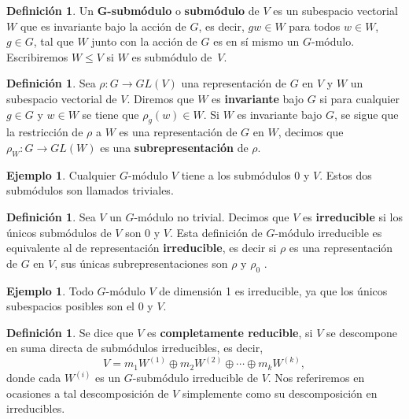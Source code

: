 \documentclass[12pt]{book}
\theoremstyle{definition}
\newtheorem{definition}[theorem]{Definición}
\newtheorem{example}[theorem]{Ejemplo}
\newcounter{in}
\newcounter{ini}
\begin{document}
\begin{definition}
  Un $\boldsymbol{G}$\textbf{-submódulo} o
  \textbf{submódulo} de $V$ es un subespacio vectorial
  $W$ que es invariante bajo la acción de $G$, es decir, $ gw\in W$
  para todos $w\in W$, $g\in G$, tal que $W$ junto con la acción de
  $G$ es en sí mismo un $G$-módulo. Escribiremos $W\leq V$ si $W$ es
  submódulo de~$V$. 
\end{definition}

\begin{definition}
  Sea $\rho:G\rightarrow GL(V)$ una representación de $G$ en $V$ y $W$
  un subespacio vectorial de $V$. Diremos que $W$ es
  \textbf{invariante} bajo $G$ si para cualquier $g\in G$ y $w\in
  W$ se tiene que $\rho_{g}(w)\in W$. Si $W$ es invariante bajo $G$, se
  sigue que la restricción de $\rho$ a $W$ es una representación
  de $G$ en $W$, decimos que $\rho_{W}:G\rightarrow GL(W)$ es una
  \textbf{subrepresentación} de $\rho$. 
\end{definition}

\begin{example}
  Cualquier $G$-módulo $V$ tiene a los submódulos 0 y $V$. Estos dos
  submódulos son llamados triviales.
\end{example}

\begin{definition}
  Sea $V$ un $G$-módulo no trivial. Decimos que $V$ es \textbf{irreducible} si
  los únicos submódulos de $V$ son $0$ y $V$. Esta definición de
  $G$-módulo irreducible es equivalente  al de representación
  \textbf{irreducible}, es decir si $\rho$ es una representación de
  $G$ en $V$, sus únicas subrepresentaciones son $\rho$ y $\rho_{0}$ .
\end{definition}

\begin{example}
  Todo $G$-módulo $V$ de dimensión 1 es irreducible, ya que los únicos
  subespacios posibles son el 0 y $V$.
\end{example}

\begin{definition}
   Se dice que $V$ es \textbf{completamente reducible}, si $V$ se
   descompone en suma directa de submódulos irreducibles,  es decir,
  \begin{equation*}
    V=m_{1}W^{(1)}\oplus m_{2}W^{(2)}\oplus\cdots \oplus m_{k}W^{(k)},
  \end{equation*}
donde cada $W^{(i)}$ es un $G$-submódulo irreducible de $V$. Nos referiremos en ocasiones a tal descomposición de $V$
simplemente como su descomposición en irreducibles.
\end{definition}
\end{document}
